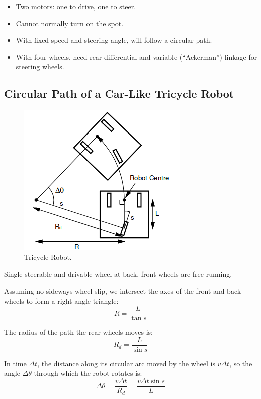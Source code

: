 \documentclass[11pt]{article}
\begin{document}
\begin{itemize}
  \item Two motors: one to drive, one to steer.
  \item Cannot normally turn on the spot.
  \item With fixed speed and steering angle, will follow a circular path.
  \item With four wheels, need rear differential and variable (``Ackerman'') linkage for steering wheels.
\end{itemize}

\subsection{Circular Path of a Car-Like Tricycle Robot}
\begin{figure}[h]
  \caption{Tricycle Robot.}
  \includegraphics[scale=0.5]{tricycle}
  \centering
\end{figure}

Single steerable and drivable wheel at back, front wheels are free running.

Assuming no sideways wheel slip, we intersect the axes of the front and back wheels to form a right-angle triangle:
\[
  R = \frac{L}{\tan s}
\]

The radius of the path the rear wheels moves is:
\[
  R_d = \frac{L}{\sin s}
\]

In time $\Delta t$, the distance along its circular arc moved by the wheel is $v\Delta t$, so the angle $\Delta \theta$ through which the robot rotates is:
\[
  \Delta \theta = \frac{v\Delta t}{R_d} = \frac{v\Delta t \sin s}{L}
\]
\end{document}
